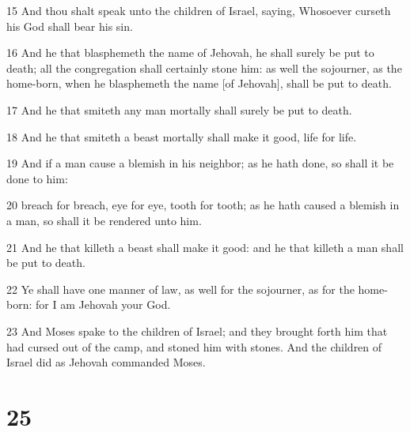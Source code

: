 \par 15 And thou shalt speak unto the children of Israel, saying, Whosoever curseth his God shall bear his sin.
\par 16 And he that blasphemeth the name of Jehovah, he shall surely be put to death; all the congregation shall certainly stone him: as well the sojourner, as the home-born, when he blasphemeth the name [of Jehovah], shall be put to death.
\par 17 And he that smiteth any man mortally shall surely be put to death.
\par 18 And he that smiteth a beast mortally shall make it good, life for life.
\par 19 And if a man cause a blemish in his neighbor; as he hath done, so shall it be done to him:
\par 20 breach for breach, eye for eye, tooth for tooth; as he hath caused a blemish in a man, so shall it be rendered unto him.
\par 21 And he that killeth a beast shall make it good: and he that killeth a man shall be put to death.
\par 22 Ye shall have one manner of law, as well for the sojourner, as for the home-born: for I am Jehovah your God.
\par 23 And Moses spake to the children of Israel; and they brought forth him that had cursed out of the camp, and stoned him with stones. And the children of Israel did as Jehovah commanded Moses.

\chapter{25}

